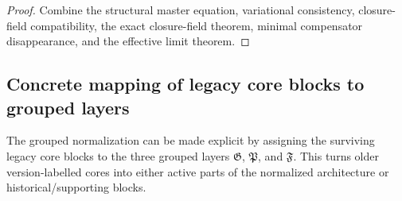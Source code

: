 \begin{proof}
Combine the structural master equation, variational consistency, closure-field compatibility, the exact closure-field theorem, minimal compensator disappearance, and the effective limit theorem.
\end{proof}

\subsection*{Concrete mapping of legacy core blocks to grouped layers}

The grouped normalization can be made explicit by assigning the surviving legacy
core blocks to the three grouped layers $\mathfrak G$, $\mathfrak P$, and
$\mathfrak F$. This turns older version-labelled cores into either active parts
of the normalized architecture or historical/supporting blocks.

